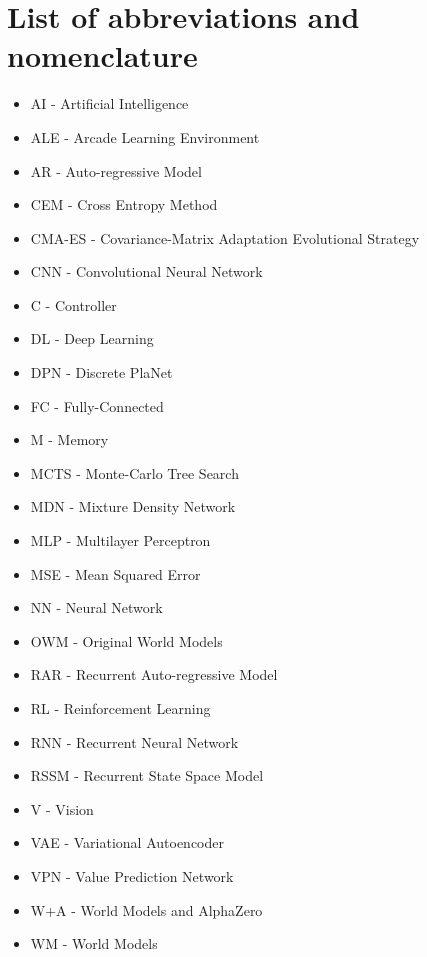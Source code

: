 
\clearpage
\section*{List of abbreviations and nomenclature} %

\begin{itemize}
\item AI - Artificial Intelligence
\item ALE - Arcade Learning Environment
\item AR - Auto-regressive Model
\item CEM - Cross Entropy Method
\item CMA-ES - Covariance-Matrix Adaptation Evolutional Strategy
\item CNN - Convolutional Neural Network
\item C - Controller
\item DL - Deep Learning
\item DPN - Discrete PlaNet
\item FC - Fully-Connected
\item M - Memory
\item MCTS - Monte-Carlo Tree Search
\item MDN - Mixture Density Network
\item MLP - Multilayer Perceptron
\item MSE - Mean Squared Error
\item NN - Neural Network
\item OWM - Original World Models
\item RAR - Recurrent Auto-regressive Model
\item RL - Reinforcement Learning
\item RNN - Recurrent Neural Network
\item RSSM - Recurrent State Space Model
\item V - Vision
\item VAE - Variational Autoencoder
\item VPN - Value Prediction Network
\item W+A - World Models and AlphaZero 
\item WM - World Models
\end{itemize}
